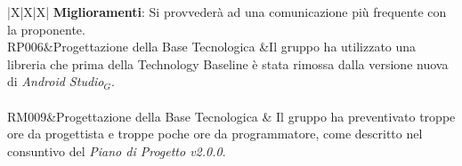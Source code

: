 \begin{tabularx}{\textwidth}{|X|X|X|}
{ 	\textbf{Miglioramenti}: Si provvederà ad una comunicazione più frequente con la proponente.}\\
     	\hline
     	    RP006&Progettazione della Base Tecnologica  &Il gruppo ha utilizzato una libreria che prima della Technology Baseline è stata rimossa dalla versione nuova di \textit{Android Studio$_{G}$}.\\
     	\hline
     	\\
     	     	\hline
     	RM009&Progettazione della Base Tecnologica & Il gruppo ha preventivato troppe ore da progettista e troppe poche ore da programmatore, come descritto nel consuntivo del \textit{Piano di Progetto v2.0.0}.\\
     	\hline
     	\\
     	\hline
     	     	

\end{tabularx}
